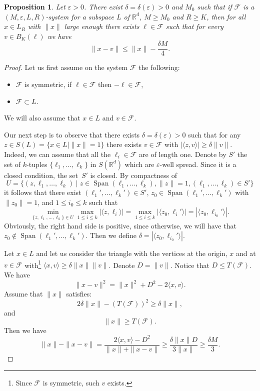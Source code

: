 \documentclass[JEP,XML,SOM,Unicode,NoEqCountersInSection]{cedram}
\DeclareMathOperator{\Span}{Span}
\newcommand{\cF}{\mathcal{F}}
\newcommand{\bR}{\mathbb{R}}
\let\eps\varepsilon
\newcounter{dummy} \numberwithin{dummy}{section}
\theoremstyle{plain}
\newtheorem{prop}[dummy]{Proposition}
\theoremstyle{definition}
\begin{document}
\begin{prop}\label{prop}
Let $\eps > 0$.
There exist $\delta = \delta(\eps) > 0$ and $M_0$ such that if
$\cF$ is a $(M,\eps,L,R)$-system for a subspace $L$ of $\bR^d$, $M \ge M_0$ and $R \ge K$, then for all $x \in L_R$ with $\| x \|$ large enough there exists $\ell \in \cF$ such that for every $v \in B_K(\ell)$
we have
\[
\| x - v\| \le \| x \| - \frac{\delta M}{4}.
\]
\end{prop}
\begin{proof}
Let us first assume on the system $\cF$ the following:
\begin{itemize}
\item $\cF$ is symmetric, \ie if $\ell \in \cF$ then $-\ell \in \cF$,
\item $\cF \subset L.$
\end{itemize}
We will also assume that $x \in L$ and $v \in \cF$.

Our next step is to observe that there exists $\delta = \delta(\eps) > 0$ such that for any $z \in S(L) = \{ x \in L \mid \| x \| = 1 \}$ there exists $v \in \cF$ with $| \langle z, v \rangle | \ge \delta \| v \|$. Indeed, we can assume that all the $\ell_i \in \cF$ are of length one. Denote by $S'$ the set of $k$-tuples $\{\ell_1,\ldots,\ell_k\}$ in $S(\bR^d)$ which are $\eps$-well spread. Since it is a closed condition, the set~$S'$ is closed. By compactness of
\[
U = \{ (z,\ell_1,\ldots,\ell_k) \mid z \in \Span(\ell_1,\ldots,\ell_k), \| z \| = 1, (\ell_1,\ldots,\ell_k) \in S' \}
\]
it follows that there exist $(\ell_1',\ldots,\ell_k') \in S'$, $z_0 \in \Span(\ell_1',\ldots,\ell_k')$ with $\| z_0 \| = 1$, and $1 \le i_0 \le k$ such that
\[
\min_{\{z,\ell_1,\ldots,\ell_k\} \in U} \max_{1 \le i \le k} | \langle z, \ell_i \rangle | = \max_{1 \le i \le k} | \langle z_0, \ell_i' \rangle | = | \langle z_0,\ell_{i_0}' \rangle| .
\]
Obviously, the right hand side is positive, since otherwise, we will have that $z_0 \not \in \Span(\ell_1',\ldots,\ell_k')$. Then we define $\delta= | \langle z_0,\ell_{i_0}' \rangle |$.

Let $x \in L$ and let us consider the triangle with the vertices at the origin, $x$ and at $v \in \cF$ with\footnote{Since $\cF$ is symmetric, such $v$ exists.} $\langle x , v \rangle \ge \delta \| x \| \| v \|$.
Denote $D = \| v \|$. Notice that $D \le T(\cF)$. We have
\[
\|x-v\|^2 = \|x\|^2 + D^2 - 2 \langle x, v \rangle.
\]
Assume that $\| x \|$ satisfies:
\[
2 \delta \| x \| - (T(\cF))^2 \ge \delta \|x \|,
\]
and
\[
\| x \| \ge T(\cF).
\]
Then we have
\[
\|x\| - \|x-v\| = \frac{2 \langle x, v \rangle - D^2}{\| x \| + \| x- v \|} \ge \frac{\delta \| x \| D}{3 \| x \|} \ge \frac{\delta M}{3}.
\]


\end{proof}
\end{document}
